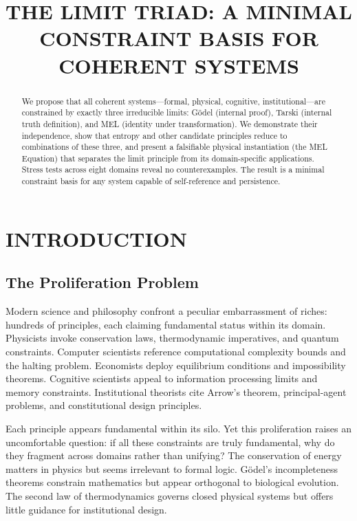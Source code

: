\documentclass[12pt]{article}
\title{\textbf{THE LIMIT TRIAD: A MINIMAL CONSTRAINT BASIS FOR COHERENT SYSTEMS}}
\author{}
\date{}
\begin{document}
\maketitle

\begin{abstract}
\noindent We propose that all coherent systems—formal, physical, cognitive, institutional—are constrained by exactly three irreducible limits: Gödel (internal proof), Tarski (internal truth definition), and MEL (identity under transformation). We demonstrate their independence, show that entropy and other candidate principles reduce to combinations of these three, and present a falsifiable physical instantiation (the MEL Equation) that separates the limit principle from its domain-specific applications. Stress tests across eight domains reveal no counterexamples. The result is a minimal constraint basis for any system capable of self-reference and persistence.
\end{abstract}

\section{INTRODUCTION}

\subsection{The Proliferation Problem}

Modern science and philosophy confront a peculiar embarrassment of riches: hundreds of principles, each claiming fundamental status within its domain. Physicists invoke conservation laws, thermodynamic imperatives, and quantum constraints. Computer scientists reference computational complexity bounds and the halting problem. Economists deploy equilibrium conditions and impossibility theorems. Cognitive scientists appeal to information processing limits and memory constraints. Institutional theorists cite Arrow's theorem, principal-agent problems, and constitutional design principles.

Each principle appears fundamental within its silo. Yet this proliferation raises an uncomfortable question: if all these constraints are truly fundamental, why do they fragment across domains rather than unifying? The conservation of energy matters in physics but seems irrelevant to formal logic. Gödel's incompleteness theorems constrain mathematics but appear orthogonal to biological evolution. The second law of thermodynamics governs closed physical systems but offers little guidance for institutional design.
\end{document}

